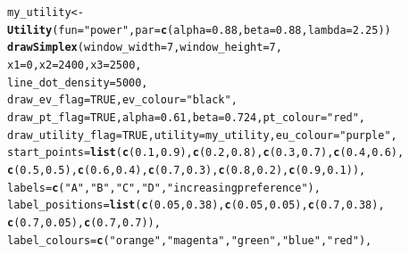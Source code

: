 \documentclass{article}\usepackage[]{graphicx}\usepackage[]{color}
\makeatletter
\newcommand{\hlnum}[1]{\textcolor[rgb]{0.686,0.059,0.569}{#1}}%
\newcommand{\hlstr}[1]{\textcolor[rgb]{0.192,0.494,0.8}{#1}}%
\newcommand{\hlstd}[1]{\textcolor[rgb]{0.345,0.345,0.345}{#1}}%
\newcommand{\hlkwb}[1]{\textcolor[rgb]{0.69,0.353,0.396}{#1}}%
\newcommand{\hlkwc}[1]{\textcolor[rgb]{0.333,0.667,0.333}{#1}}%
\newcommand{\hlkwd}[1]{\textcolor[rgb]{0.737,0.353,0.396}{\textbf{#1}}}%
\newenvironment{kframe}{%
 \def\at@end@of@kframe{}%
 \ifinner\ifhmode%
  \def\at@end@of@kframe{\end{minipage}}%
  \begin{minipage}{\columnwidth}%
 \fi\fi%
 \def\FrameCommand##1{\hskip\@totalleftmargin \hskip-\fboxsep
 \colorbox{shadecolor}{##1}\hskip-\fboxsep
     \hskip-\linewidth \hskip-\@totalleftmargin \hskip\columnwidth}%
 \MakeFramed {\advance\hsize-\width
   \@totalleftmargin\z@ \linewidth\hsize
   \@setminipage}}%
 {\par\unskip\endMakeFramed%
 \at@end@of@kframe}
\newenvironment{knitrout}{}{} %
\makeatother
\begin{document}
\begin{knitrout}
\color{fgcolor}\begin{kframe}
\begin{alltt}
\hlstd{my_utility} \hlkwb{<-} \hlkwd{Utility}\hlstd{(}\hlkwc{fun}\hlstd{=}\hlstr{"power"}\hlstd{,} \hlkwc{par}\hlstd{=}\hlkwd{c}\hlstd{(}\hlkwc{alpha}\hlstd{=}\hlnum{0.88}\hlstd{,} \hlkwc{beta}\hlstd{=}\hlnum{0.88}\hlstd{,} \hlkwc{lambda}\hlstd{=}\hlnum{2.25}\hlstd{))}
\hlkwd{drawSimplex}\hlstd{(}\hlkwc{window_width}\hlstd{=}\hlnum{7}\hlstd{,} \hlkwc{window_height}\hlstd{=}\hlnum{7}\hlstd{,}
        \hlkwc{x1}\hlstd{=}\hlnum{0}\hlstd{,} \hlkwc{x2}\hlstd{=}\hlnum{2400}\hlstd{,} \hlkwc{x3}\hlstd{=}\hlnum{2500}\hlstd{,}
        \hlkwc{line_dot_density}\hlstd{=}\hlnum{5000}\hlstd{,}
        \hlkwc{draw_ev_flag}\hlstd{=}\hlnum{TRUE}\hlstd{,} \hlkwc{ev_colour}\hlstd{=}\hlstr{"black"}\hlstd{,}
        \hlkwc{draw_pt_flag}\hlstd{=}\hlnum{TRUE}\hlstd{,} \hlkwc{alpha}\hlstd{=}\hlnum{0.61}\hlstd{,} \hlkwc{beta}\hlstd{=}\hlnum{0.724}\hlstd{,} \hlkwc{pt_colour}\hlstd{=}\hlstr{"red"}\hlstd{,}
        \hlkwc{draw_utility_flag}\hlstd{=}\hlnum{TRUE}\hlstd{,} \hlkwc{utility}\hlstd{=my_utility,} \hlkwc{eu_colour}\hlstd{=}\hlstr{"purple"}\hlstd{,}
        \hlkwc{start_points}\hlstd{=}\hlkwd{list}\hlstd{(}\hlkwd{c}\hlstd{(}\hlnum{0.1}\hlstd{,}\hlnum{0.9}\hlstd{),}\hlkwd{c}\hlstd{(}\hlnum{0.2}\hlstd{,}\hlnum{0.8}\hlstd{),}\hlkwd{c}\hlstd{(}\hlnum{0.3}\hlstd{,}\hlnum{0.7}\hlstd{),}\hlkwd{c}\hlstd{(}\hlnum{0.4}\hlstd{,}\hlnum{0.6}\hlstd{),}
                \hlkwd{c}\hlstd{(}\hlnum{0.5}\hlstd{,}\hlnum{0.5}\hlstd{),}\hlkwd{c}\hlstd{(}\hlnum{0.6}\hlstd{,}\hlnum{0.4}\hlstd{),}\hlkwd{c}\hlstd{(}\hlnum{0.7}\hlstd{,}\hlnum{0.3}\hlstd{),}\hlkwd{c}\hlstd{(}\hlnum{0.8}\hlstd{,}\hlnum{0.2}\hlstd{),}\hlkwd{c}\hlstd{(}\hlnum{0.9}\hlstd{,}\hlnum{0.1}\hlstd{)),}
        \hlkwc{labels}\hlstd{=}\hlkwd{c}\hlstd{(}\hlstr{"A"}\hlstd{,}\hlstr{"B"}\hlstd{,}\hlstr{"C"}\hlstd{,}\hlstr{"D"}\hlstd{,}\hlstr{"increasing preference"}\hlstd{),}
        \hlkwc{label_positions}\hlstd{=}\hlkwd{list}\hlstd{(}\hlkwd{c}\hlstd{(}\hlnum{0.05}\hlstd{,}\hlnum{0.38}\hlstd{),}\hlkwd{c}\hlstd{(}\hlnum{0.05}\hlstd{,}\hlnum{0.05}\hlstd{),}\hlkwd{c}\hlstd{(}\hlnum{0.7}\hlstd{,}\hlnum{0.38}\hlstd{),}
                \hlkwd{c}\hlstd{(}\hlnum{0.7}\hlstd{,}\hlnum{0.05}\hlstd{),}\hlkwd{c}\hlstd{(}\hlnum{0.7}\hlstd{,}\hlnum{0.7}\hlstd{)),}
        \hlkwc{label_colours}\hlstd{=}\hlkwd{c}\hlstd{(}\hlstr{"orange"}\hlstd{,}\hlstr{"magenta"}\hlstd{,}\hlstr{"green"}\hlstd{,}\hlstr{"blue"}\hlstd{,}\hlstr{"red"}\hlstd{),}

\end{alltt}
\end{kframe}
\end{knitrout}
\end{document}

